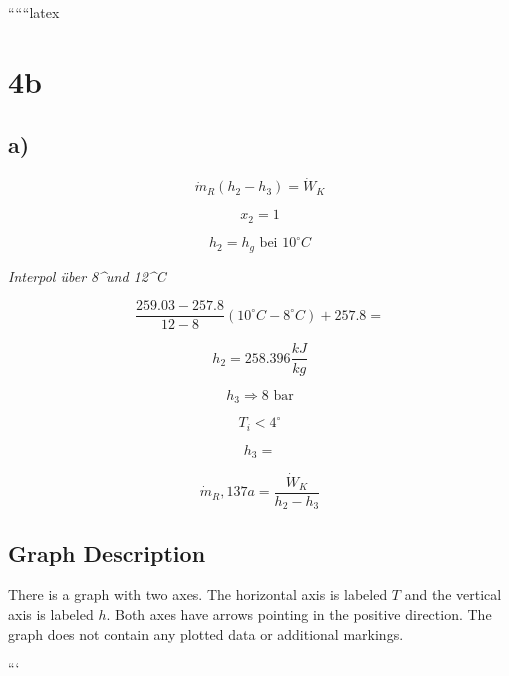
``````latex


\section*{4b}
\subsection*{a)}

\[
\dot{m}_R (h_2 - h_3) = \dot{W}_K
\]

\[
x_2 = 1
\]

\[
h_2 = h_g \text{ bei } 10^\circ C
\]

\textit{Interpol über 8^\circ und 12^\circ C}

\[
\frac{259.03 - 257.8}{12 - 8} (10^\circ C - 8^\circ C) + 257.8 =
\]

\[
h_2 = 258.396 \frac{kJ}{kg}
\]

\[
h_3 \Rightarrow 8 \text{ bar}
\]

\[
T_i < 4^\circ
\]

\[
h_3 =
\]

\[
\dot{m}_R, 137a = \frac{\dot{W}_K}{h_2 - h_3}
\]

\subsection*{Graph Description}

There is a graph with two axes. The horizontal axis is labeled \( T \) and the vertical axis is labeled \( h \). Both axes have arrows pointing in the positive direction. The graph does not contain any plotted data or additional markings.

```